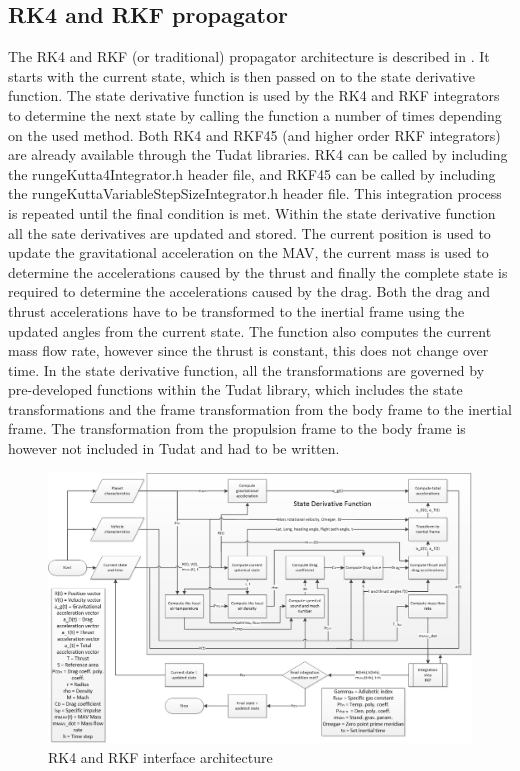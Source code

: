 \subsection{\ac{RK4} and \ac{RKF} propagator}
\label{subsec:rkpropagator}
The \ac{RK4} and \ac{RKF} (or traditional) propagator architecture is described in . It starts with the current state, which is then passed on to the state derivative function. The state derivative function is used by the \ac{RK4} and \ac{RKF} integrators to determine the next state by calling the function a number of times depending on the used method. Both \ac{RK4} and \ac{RKF45} (and higher order \ac{RKF} integrators) are already available through the \ac{Tudat} libraries. \ac{RK4} can be called by including the rungeKutta4Integrator.h header file, and \ac{RKF45} can be called by including the rungeKuttaVariableStepSizeIntegrator.h header file. This integration process is repeated until the final condition is met. Within the state derivative function all the sate derivatives are updated and stored. The current position is used to update the gravitational acceleration on the \ac{MAV}, the current mass is used to determine the accelerations caused by the thrust and finally the complete state is required to determine the accelerations caused by the drag. Both the drag and thrust accelerations have to be transformed to the inertial frame using the updated angles from the current state. The function also computes the current mass flow rate, however since the thrust is constant, this does not change over time. In the state derivative function, all the transformations are governed by pre-developed functions within the \ac{Tudat} library, which includes the state transformations and the frame transformation from the body frame to the inertial frame. The transformation from the propulsion frame to the body frame is however not included in \ac{Tudat} and had to be written.


\begin{figure}[!ht]
\centering
\includegraphics[width=1.5\textwidth, angle = 90]{figures/software/RK_Propagator.png}
\caption{\ac{RK4} and \ac{RKF} interface architecture}
\label{fig:RK_Propagator}
\end{figure}

